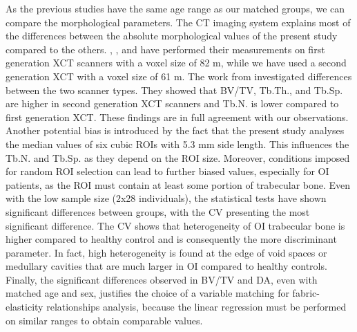 \documentclass[a4paper,fleqn]{DC_ArtStyle}
\begin{document}
	As the previous studies \cite{Folkestad2012,Kocijan2015,Rolvien2018} have the same age range as our matched groups, we can compare the morphological parameters. The CT imaging system explains most of the differences between the absolute morphological values of the present study compared to the others. \citeauthor{Folkestad2012}\cite{Folkestad2012}, \citeauthor{Kocijan2015}\cite{Kocijan2015}, and \citeauthor{Rolvien2018}\cite{Rolvien2018} have performed their measurements on first generation XCT scanners with a voxel size of 82 \si{\micro}m, while we have used a second generation XCT with a voxel size of 61 \si{\micro}m. The work from \citeauthor{Agarwal2016}\cite{Agarwal2016} investigated differences between the two scanner types. They showed that BV/TV, Tb.Th., and Tb.Sp. are higher in second generation XCT scanners and Tb.N. is lower compared to first generation XCT. These findings are in full agreement with our observations. Another potential bias is introduced by the fact that the present study analyses the median values of six cubic ROIs with 5.3 mm side length. This influences the Tb.N. and Tb.Sp. as they depend on the ROI size. Moreover, conditions imposed for random ROI selection can lead to further biased values, especially for OI patients, as the ROI must contain at least some portion of trabecular bone. Even with the low sample size (2x28 individuals), the statistical tests have shown significant differences between groups, with the CV presenting the most significant difference. The CV shows that heterogeneity of OI trabecular bone is higher compared to healthy control and is consequently the more discriminant parameter. In fact, high heterogeneity is found at the edge of void spaces or medullary cavities that are much larger in OI compared to healthy controls. Finally, the significant differences observed in BV/TV and DA, even with matched age and sex, justifies the choice of a variable matching for fabric-elasticity relationships analysis, because the linear regression must be performed on similar ranges to obtain comparable values. \\
	
\end{document}
